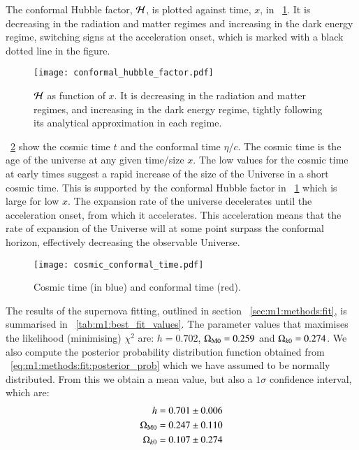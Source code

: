     The conformal Hubble factor, $\mathcal{H}$, is plotted against time, $x$, in ~\cref{fig:m1:conformal_hubble_factor_Hp}. It is decreasing in the radiation and matter regimes and increasing in the dark energy regime, switching signs at the acceleration onset, which is marked with a black dotted line in the figure. 
    \begin{figure}
        \texttt{[image: conformal\_hubble\_factor.pdf]}
        \caption{$\mathcal{H}$ as function of $x$. It is decreasing in the radiation and matter regimes, and increasing in the dark energy regime, tightly following its analytical approximation in each regime.}
        \label{fig:m1:conformal_hubble_factor_Hp}
    \end{figure}

    ~\cref{fig:m1:cosmic_conformal_time} show the cosmic time $t$ and the conformal time $\eta/c$. The cosmic time is the age of the universe at any given time/size $x$. The low values for the cosmic time at early times suggest a rapid increase of the size of the Universe in a short cosmic time. This is supported by the conformal Hubble factor in ~\cref{fig:m1:conformal_hubble_factor_Hp} which is large for low $x$. The expansion rate of the universe decelerates until the acceleration onset, from which it accelerates. This acceleration means that the rate of expansion of the Universe will at some point surpass the conformal horizon, effectively decreasing the observable Universe. 

    \begin{figure}
        \texttt{[image: cosmic\_conformal\_time.pdf]}
        \caption{Cosmic time (in blue) and conformal time (red).}
        \label{fig:m1:cosmic_conformal_time}
    \end{figure}

    The results of the supernova fitting, outlined in section ~\cref{sec:m1:methods:fit}, is summarised in ~\cref{tab:m1:best_fit_values}. The parameter values that maximises the likelihood (minimising) $\chi^2$ are: $h=0.702$, $\Omega_\mathrm{M0} = 0.259$ and $\Omega_{k0} = 0.274$. We also compute the posterior probability distribution function obtained from ~\cref{eq:m1:methods:fit:posterior_prob} which we have assumed to be normally distributed. From this we obtain a mean value, but also a $1\sigma$ confidence interval, which are:
    \begin{equation}\label{eq:m1:results:posterior_results}
        \begin{split}
            h &= 0.701\pm0.006 \\
            \Omega_\mathrm{M0} &= 0.247\pm0.110 \\
            \Omega_{k0} &= 0.107 \pm 0.274
        \end{split}
    \end{equation}
    
